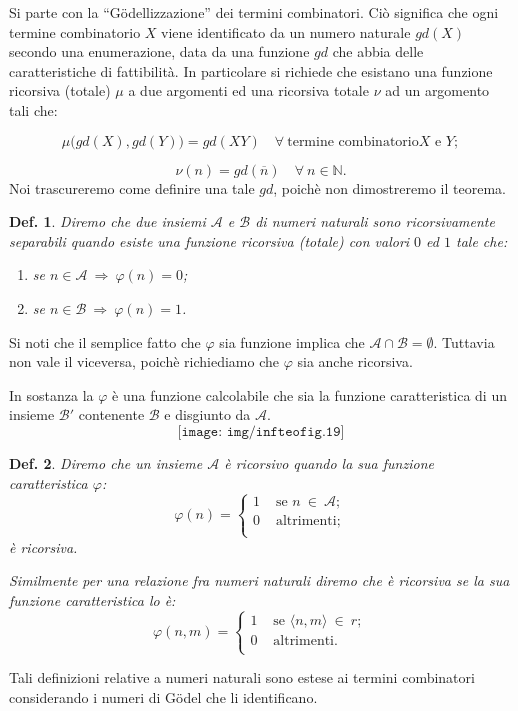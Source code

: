 \documentclass{book}
\newtheorem{definizione}{Def.}[chapter]
\begin{document}
Si parte con la ``G\"odellizzazione'' dei termini combinatori. Ci\`o significa 
che ogni termine combinatorio $X$ viene identificato da un numero naturale 
$gd(X)$ secondo una enumerazione, data da una funzione $gd$ che abbia delle 
caratteristiche di fattibilit\`a. In particolare si richiede che esistano una
funzione ricorsiva (totale) $\mu$ a due argomenti ed una ricorsiva totale $\nu$
ad un argomento tali che:

\[
\mu\bigl(gd(X), gd(Y)\bigr) = gd(XY) \quad \forall \ \text{termine combinatorio
$X$ e $Y$};
\]

\[
\nu(n) = gd(\overline{n}) \quad \forall \ n \in \mathbb{N}.
\]
Noi trascureremo come definire una tale $gd$, poich\`e non dimostreremo il 
teorema.

\begin{definizione}
Diremo che due insiemi $\mathcal{A}$ e $\mathcal{B}$ di numeri naturali sono
\emph{ricorsivamente separabili} quando esiste una funzione ricorsiva (totale)
con valori $0$ ed $1$ tale che:
\begin{enumerate}
\item[-]se $n \in \mathcal{A} \ \Longrightarrow \ \varphi(n) = 0$;
\item[-]se $n \in \mathcal{B} \ \Longrightarrow \ \varphi(n) = 1$.
\end{enumerate}
\end{definizione}
Si noti che il semplice fatto che $\varphi$ sia funzione implica che 
$\mathcal{A} \cap \mathcal{B} = \emptyset$. Tuttavia non vale il viceversa,
poich\`e richiediamo che $\varphi$ sia anche ricorsiva.

In sostanza la $\varphi$ \`e una funzione calcolabile che sia la funzione
caratteristica di un insieme $\mathcal{B'}$ contenente $\mathcal{B}$ e 
disgiunto da $\mathcal{A}$.
\[
\texttt{[image: img/infteofig.19]}
\]

\begin{definizione}
Diremo che un insieme $\mathcal{A}$ \`e \emph{ricorsivo} quando la sua funzione
caratteristica $\varphi$:
\[
\varphi(n) = \left\{ \begin{array}{ll}
                      1 & \text{ se } n \ \in \ \mathcal{A}; \\
		      0 & \text{ altrimenti;} \\
		    \end{array}
            \right.
\]
\`e ricorsiva.

Similmente per una relazione fra numeri naturali diremo che
\`e \emph{ricorsiva} se la sua funzione caratteristica lo \`e: 
\[
\varphi(n, m) = \left\{ \begin{array}{ll}
                      1 & \text{ se }\langle n, m \rangle\ \in \ r; \\
		      0 & \text{ altrimenti.} \\
		    \end{array}
            \right.
\]
\end{definizione}
Tali definizioni relative a numeri naturali sono estese ai termini combinatori
considerando i numeri di G\"odel che li identificano.
\end{document}
